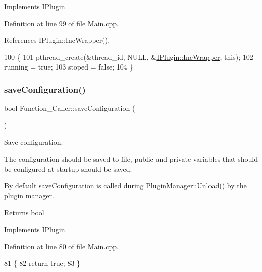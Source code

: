 Implements \hyperlink{class_i_plugin_a46b4ace767e77f9db9c9585e99c09039}{I\+Plugin}.



Definition at line 99 of file Main.\+cpp.



References I\+Plugin\+::\+Inc\+Wrapper().


\begin{DoxyCode}
100 \{
101     pthread\_create(&thread\_id, NULL, &\hyperlink{class_i_plugin_a62d22be2fdf66eb7f5c2f797f5f3d7f3}{IPlugin::IncWrapper}, \textcolor{keyword}{this});
102     running = \textcolor{keyword}{true};
103     stoped = \textcolor{keyword}{false};
104 \}
\end{DoxyCode}
\mbox{\label{class_function___caller_a639edde2994f2317a922c2a80083ce54}} 
\subsubsection{\texorpdfstring{save\+Configuration()}{saveConfiguration()}}
{\footnotesize\ttfamily bool Function\+\_\+\+Caller\+::save\+Configuration (\begin{DoxyParamCaption}{ }\end{DoxyParamCaption})\hspace{0.3cm}{\ttfamily [virtual]}}



Save configuration. 

The configuration should be saved to file, public and private variables that should be configured at startup should be saved.

By default save\+Configuration is called during \hyperlink{class_plugin_manager_ab651a05d6fcb92562807e9f5ecc30855}{Plugin\+Manager\+::\+Unload()} by the plugin manager.

\begin{DoxyReturn}{Returns}
bool 
\end{DoxyReturn}


Implements \hyperlink{class_i_plugin_a79b5c42b1c7b08257a6110b2091039bc}{I\+Plugin}.



Definition at line 80 of file Main.\+cpp.


\begin{DoxyCode}
81 \{
82     \textcolor{keywordflow}{return} \textcolor{keyword}{true};
83 \}
\end{DoxyCode}
\mbox{\label{class_function___caller_af099d310156da34103de5486995b00e2}} 
